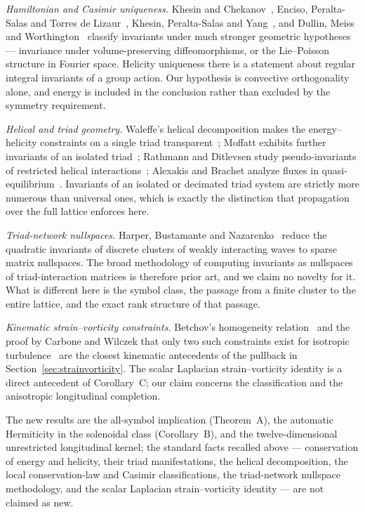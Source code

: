 \documentclass[11pt]{article}
\theoremstyle{definition}
\theoremstyle{remark}
\theoremstyle{plain}
\begin{document}
\emph{Hamiltonian and Casimir uniqueness.} Khesin and
Chekanov~\cite{KhesinChekanov1989}, Enciso, Peralta-Salas and Torres de
Lizaur~\cite{EncisoEtAl2016}, Khesin, Peralta-Salas and
Yang~\cite{KhesinEtAl2020}, and Dullin, Meiss and
Worthington~\cite{DullinEtAl2019} classify invariants under much stronger
geometric hypotheses --- invariance under volume-preserving diffeomorphisms,
or the Lie--Poisson structure in Fourier space. Helicity uniqueness there is a
statement about regular integral invariants of a group action. Our hypothesis
is convective orthogonality alone, and energy is included in the conclusion
rather than excluded by the symmetry requirement.

\emph{Helical and triad geometry.} Waleffe's helical decomposition makes the
energy--helicity constraints on a single triad transparent~\cite{Waleffe1992};
Moffatt exhibits further invariants of an isolated triad~\cite{Moffatt2014};
Rathmann and Ditlevsen study pseudo-invariants of restricted helical
interactions~\cite{RathmannDitlevsen2017}; Alexakis and Brachet analyze fluxes
in quasi-equilibrium~\cite{AlexakisBrachet2020}. Invariants of an isolated or
decimated triad system are strictly more numerous than universal ones, which
is exactly the distinction that propagation over the full lattice enforces
here.

\emph{Triad-network nullspaces.} Harper, Bustamante and
Nazarenko~\cite{HarperEtAl2013} reduce the quadratic invariants of discrete
clusters of weakly interacting waves to sparse matrix nullspaces. The broad
methodology of computing invariants as nullspaces of triad-interaction
matrices is therefore prior art, and we claim no novelty for it. What is
different here is the symbol class, the passage from a finite cluster to the
entire lattice, and the exact rank structure of that passage.

\emph{Kinematic strain--vorticity constraints.} Betchov's homogeneity
relation~\cite{Betchov1956} and the proof by Carbone and Wilczek that only two
such constraints exist for isotropic turbulence~\cite{CarboneWilczek2022} are
the closest kinematic antecedents of the pullback in
Section~\ref{sec:strainvorticity}. The scalar Laplacian
strain--vorticity identity is a direct antecedent of Corollary~C; our claim
concerns the classification and the anisotropic longitudinal completion.

The new results are the all-symbol implication (Theorem~A), the automatic
Hermiticity in the solenoidal class (Corollary~B), and the twelve-dimensional
unrestricted longitudinal kernel; the standard facts recalled above ---
conservation of energy and helicity, their triad manifestations, the helical
decomposition, the local conservation-law and Casimir classifications, the
triad-network nullspace methodology, and the scalar Laplacian
strain--vorticity identity --- are not claimed as new.
\end{document}
